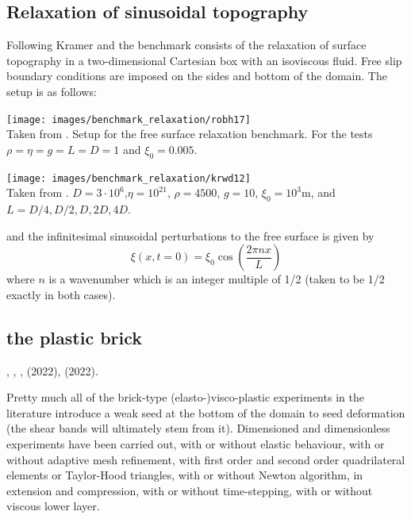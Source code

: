 \subsection{Relaxation of sinusoidal topography}

Following Kramer \etal \cite[Section 3.1.1]{krwd12} and \cite{robh17} 
the benchmark consists of the relaxation of surface topography in a 
two-dimensional Cartesian box with an isoviscous fluid. 
Free slip boundary conditions are imposed on the sides and bottom of the domain.
The setup is as follows:

\begin{center}
\begin{minipage}{0.45\textwidth}
\centering
\texttt{[image: images/benchmark\_relaxation/robh17]}\\
{\captionfont Taken from \cite{robh17}. Setup for the free surface relaxation benchmark.
For the tests $\rho=\eta=g=L=D=1$ and $\xi_0=0.005$.}
\end{minipage}\hfill
\begin{minipage}{0.45\textwidth}
\centering
\texttt{[image: images/benchmark\_relaxation/krwd12]}\\
{\captionfont Taken from \cite{krwd12}. $D=3\cdot 10^6$,$\eta=10^{21}$, $\rho=4500$, $g=10$, $\xi_0=10^3$m, and 
$L=D/4,D/2,D,2D,4D$.}
\end{minipage}
\end{center}
and the infinitesimal sinusoidal perturbations to the free surface is given by
\[
\xi(x,t=0)=\xi_0 \cos \left( \frac{2 \pi n x}{L}  \right)
\]
where $n$ is a wavenumber which is an integer multiple of 1/2 (taken to be 1/2 exactly in both cases).


\subsection{the plastic brick} \label{ss:plasticbrick}

\Literature \textcite{hans03},
\textcite{moml07},
\textcite{lemm08},
\cite{kaus10,elga10,qurj09,mishin11,maie12,spmw16,gltf18,frbt19,aspectmanual}
\textcite{dakg22} (2022), \textcite{mivg22} (2022).

Pretty much all of the brick-type (elasto-)visco-plastic experiments in the literature
introduce a weak seed at the bottom of the domain to seed deformation (the shear bands
will ultimately stem from it). 
Dimensioned and dimensionless experiments have been carried out, with or without 
elastic behaviour, with or without adaptive mesh refinement, with first order and 
second order quadrilateral elements or Taylor-Hood triangles, with or without 
Newton algorithm, in extension and compression, with or without time-stepping,
with or without viscous lower layer. 



